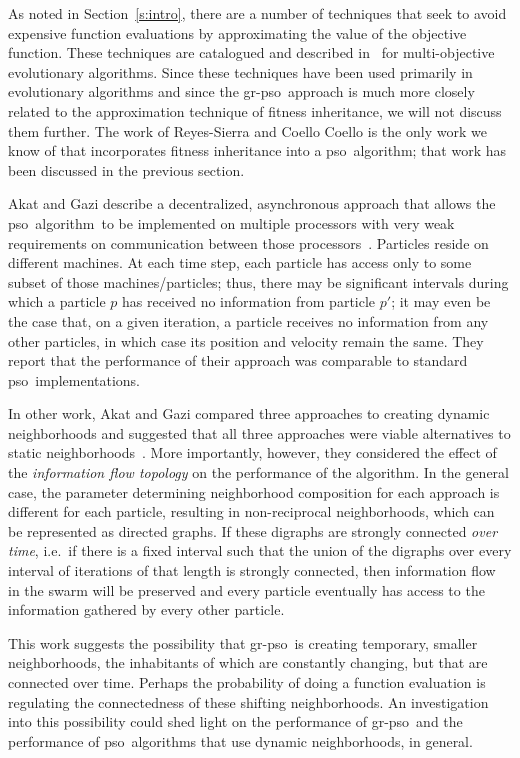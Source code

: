 \documentclass[a4paper,twoside]{article}
\newcommand{\pso}{{\sc pso}}
\newcommand{\cfe}{{\sc gr-pso}}
\newcommand{\alg}{algorithm}
\begin{document}
As noted in Section~\ref{s:intro}, there are a number of techniques that seek to avoid expensive function evaluations by approximating the value of the objective function.  These techniques are catalogued and described in~\cite{santana-quintero08} for multi-objective evolutionary algorithms.  Since these techniques have been used primarily in evolutionary algorithms and since the \cfe\ approach is much more closely related to the approximation technique of fitness inheritance, we will not discuss them further.  The work of Reyes-Sierra and Coello Coello is the only work we know of that incorporates fitness inheritance into a \pso\ \alg; that work has been discussed in the previous section.

Akat and Gazi describe a decentralized, asynchronous approach that allows the \pso\ \alg\ to be implemented on multiple processors with very weak requirements on communication between those processors~\cite{akat08b}.  Particles reside on different machines.  At each time step, each particle has access only to some subset of those machines/particles;
thus, there may be significant intervals during which a particle $p$ has received no information from particle $p'$; it may even be the case that, on a given iteration, a particle receives no information from any other particles, in which case its position and velocity remain the same.  
They report that the performance of their approach was comparable to standard \pso\ implementations.  

In other work, Akat and Gazi compared three approaches to creating dynamic neighborhoods 
and suggested that all three approaches were viable alternatives to static neighborhoods~\cite{akat08a}.  
More importantly, however, they considered the effect of the \emph{information flow topology} on the performance of the algorithm.  In the general case, the parameter determining neighborhood composition for each approach is different for each particle, resulting in non-reciprocal neighborhoods, which can be represented as directed graphs. If these digraphs are strongly connected \emph{over time}, i.e.\ if there is a fixed interval such that the union of the digraphs over every interval of iterations of that length is strongly connected, then information flow in the swarm will be preserved and every particle eventually has access to the information gathered by every other particle. 

This  work suggests the possibility that  \cfe\ is creating temporary, smaller neighborhoods, the inhabitants of which are constantly changing, but that are connected over time.  Perhaps the probability of doing a function evaluation is regulating the connectedness of these shifting neighborhoods. An investigation into this possibility could shed light on the performance of \cfe\ and the performance of \pso\ algorithms that use dynamic neighborhoods, in general.
\end{document}
